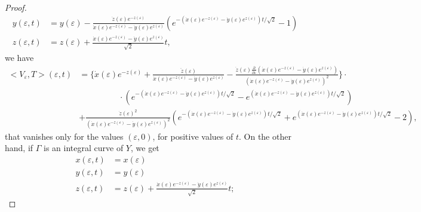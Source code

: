 \documentclass[10pt]{amsart}
\theoremstyle{definition}
\theoremstyle{remark}
\numberwithin{equation}{section}
\begin{document}
\begin{proof}
\begin{equation}
\begin{split}
y({\varepsilon},t)&=y({\varepsilon})-\frac{\dot{z}({\varepsilon})e^{-z({\varepsilon})}}{\dot{x}({\varepsilon})e^{-z({\varepsilon})}-\dot{y}({\varepsilon})e^{z({\varepsilon})}}(e^{-(\dot{x}({\varepsilon})e^{-z({\varepsilon})}-\dot{y}({\varepsilon})e^{z({\varepsilon})})t/\sqrt{2}}-1)\\
z({\varepsilon},t)&=z({\varepsilon})+\frac{\dot{x}({\varepsilon})e^{-z({\varepsilon})}-\dot{y}({\varepsilon})e^{z({\varepsilon})}}{\sqrt{2}}t,
\end{split}
\end{equation}
we have 
\begin{equation}
\begin{split}
{\big<{V_{\varepsilon},T}\big>}({\varepsilon},t)&=\bigg \{\dot{x}({\varepsilon})e^{-z({\varepsilon})}+\frac{\ddot{z}({\varepsilon})}{\dot{x}({\varepsilon})e^{-z({\varepsilon})}-\dot{y}({\varepsilon})e^{z({\varepsilon})}}-            
\frac{\dot{z}({\varepsilon})\frac{\partial}{\partial{\varepsilon}}(\dot{x}({\varepsilon})e^{-z({\varepsilon})}-\dot{y}({\varepsilon})e^{z({\varepsilon})})}{(\dot{x}({\varepsilon})e^{-z({\varepsilon})}-\dot{y}({\varepsilon})e^{z({\varepsilon})})^2}
\bigg\}\cdot\\
&\hspace{2cm}\cdot(e^{-(\dot{x}({\varepsilon})e^{-z({\varepsilon})}-\dot{y}({\varepsilon})e^{z({\varepsilon})})t/\sqrt{2}}-e^{(\dot{x}({\varepsilon})e^{-z({\varepsilon})}-\dot{y}({\varepsilon})e^{z({\varepsilon})})t/\sqrt{2}})\\
&+\frac{\dot{z}({\varepsilon})^2}{(\dot{x}({\varepsilon})e^{-z({\varepsilon})}-\dot{y}({\varepsilon})e^{z({\varepsilon})})^2}(e^{-(\dot{x}({\varepsilon})e^{-z({\varepsilon})}-\dot{y}({\varepsilon})e^{z({\varepsilon})})t/\sqrt{2}}+e^{(\dot{x}({\varepsilon})e^{-z({\varepsilon})}-\dot{y}({\varepsilon})e^{z({\varepsilon})})t/\sqrt{2}}-2),
\end{split}
\end{equation}
that vanishes only for the values $({\varepsilon},0)$, for positive values of $t$. On the other hand, if ${\Gamma}$ is an integral curve of $Y$, we get 
\begin{equation}
\begin{split}
x({\varepsilon},t)&=x({\varepsilon})\\
y({\varepsilon},t)&=y({\varepsilon})\\
z({\varepsilon},t)&=z({\varepsilon})+\frac{\dot{x}({\varepsilon})e^{-z({\varepsilon})}-\dot{y}({\varepsilon})e^{z({\varepsilon})}}{\sqrt{2}}t;
\end{split}

\end{equation}
\end{proof}
\end{document}
